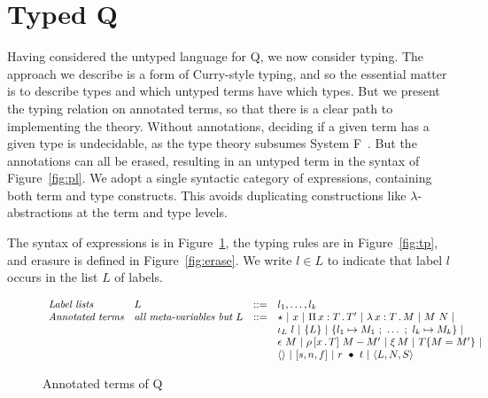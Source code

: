 \documentclass{article}
\begin{document}
\section{Typed Q}

Having considered the untyped language for Q, we now consider typing.  The approach we describe
is a form of Curry-style typing, and so the essential matter is to describe types and which
untyped terms have which types.  But we present the typing relation on annotated terms, so
that there is a clear path to implementing the theory.  Without annotations, deciding if a
given term has a given type is undecidable, as the type theory subsumes System F~\cite{wells99}.
But the annotations can all be erased, resulting in an untyped term in the syntax of Figure~\ref{fig:pl}.
We adopt a single syntactic category of expressions, containing both term and type constructs.
This avoids duplicating constructions like $\lambda$-abstractions at the term and type levels.

The syntax of expressions is in Figure~\ref{fig:syn}, the typing rules
are in Figure~\ref{fig:tp}, and erasure is defined in
Figure~\ref{fig:erase}.  We write $l \in L$ to indicate that label $l$ occurs in the list $L$ of labels.

\begin{figure}
  \[
  \begin{array}{llll}
    \textit{Label lists} & L & ::= & l_1,\ldots,l_k \\ 
    \textit{Annotated terms} & \textit{all meta-variables but } L & ::= & \star\ |\ x\ |\ \Pia{x}{T}{T'}\ |\  \tlam{x}{T}{M}\ |\ M\ N\ |\\
    \ &\ &\ & \inj{L}{l}\ |\ \{ L \}\ |\ \{ l_1 \mapsto M_1\ ;\ \ldots\ ;\ l_k\mapsto M_k \} \ | \\
    \ &\ &\ & \rfl{M}\ |\ \cng{x}{T}{M}{M'}\ |\ \ext{M}\ |\ \eqtm{M}{T}{M'} \ | \\
    \ &\ &\ & \wunit\ |\ \ctor{s}{n}{f}\ |\ \wrec{r}{t}\ |\ \w{L}{N}{S}
  \end{array}
  \]
\caption{Annotated terms of Q}
\label{fig:syn}
\end{figure}
\end{document}
